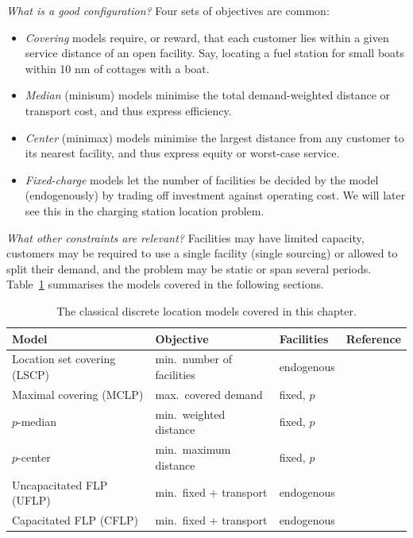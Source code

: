 \emph{What is a good configuration?} Four sets of objectives are common:
\begin{itemize}
  \item \emph{Covering} models require, or reward, that each customer lies within a given service distance of an open facility. Say, locating a fuel station for small boats within 10 nm of cottages with a boat.
  \item \emph{Median} (minisum) models minimise the total demand-weighted distance or transport cost, and thus express efficiency.
  \item \emph{Center} (minimax) models minimise the largest distance from any customer to its nearest facility, and thus express equity or worst-case service.
  \item \emph{Fixed-charge} models let the number of facilities be decided by the model (endogenously) by trading off investment against operating cost. We will later see this in the charging station location problem.
\end{itemize}

\emph{What other constraints are relevant?} Facilities may have limited capacity, customers may be required to use a single facility (single sourcing) or allowed to split their demand, and the problem may be static or span several periods. Table~\ref{tab:fl-models} summarises the models covered in the following sections.

\begin{table}[htbp]
\centering
\caption{The classical discrete location models covered in this chapter.}
\label{tab:fl-models}
\small
\begin{tabular}{@{}llll@{}}
\toprule
Model & Objective & Facilities & Reference \\
\midrule
Location set covering (LSCP) & min.\ number of facilities & endogenous & \citet{Toregas1971} \\
Maximal covering (MCLP) & max.\ covered demand & fixed, $p$ & \citet{Church1974} \\
$p$-median & min.\ weighted distance & fixed, $p$ & \citet{Hakimi1964} \\
$p$-center & min.\ maximum distance & fixed, $p$ & \citet{Hakimi1964} \\
Uncapacitated FLP (UFLP) & min.\ fixed + transport & endogenous & \citet{Balinski1965} \\
Capacitated FLP (CFLP) & min.\ fixed + transport & endogenous & \citet{Daskin2013} \\
\bottomrule
\end{tabular}
\end{table}

